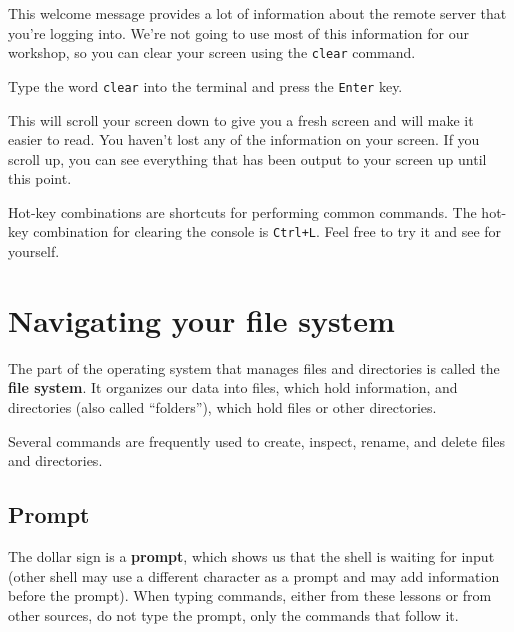 \documentclass[
  letterpaper,
  DIV=11,
  numbers=noendperiod]{scrreprt}
\begin{document}
This welcome message provides a lot of information about the remote
server that you're logging into. We're not going to use most of this
information for our workshop, so you can clear your screen using the
\texttt{clear} command.

Type the word \texttt{clear} into the terminal and press the
\texttt{Enter} key.

This will scroll your screen down to give you a fresh screen and will
make it easier to read. You haven't lost any of the information on your
screen. If you scroll up, you can see everything that has been output to
your screen up until this point.

\begin{tcolorbox}[enhanced jigsaw, opacitybacktitle=0.6, colback=white, coltitle=black, opacityback=0, rightrule=.15mm, toptitle=1mm, toprule=.15mm, bottomtitle=1mm, colframe=quarto-callout-tip-color-frame, arc=.35mm, titlerule=0mm, colbacktitle=quarto-callout-tip-color!10!white, leftrule=.75mm, title=\textcolor{quarto-callout-tip-color}{\faLightbulb}\hspace{0.5em}{Tip}, breakable, bottomrule=.15mm, left=2mm]

Hot-key combinations are shortcuts for performing common commands. The
hot-key combination for clearing the console is \texttt{Ctrl+L}. Feel
free to try it and see for yourself.

\end{tcolorbox}

\section{Navigating your file system}\label{navigating-your-file-system}

The part of the operating system that manages files and directories is
called the \textbf{file system}. It organizes our data into files, which
hold information, and directories (also called ``folders''), which hold
files or other directories.

Several commands are frequently used to create, inspect, rename, and
delete files and directories.

\subsection{Prompt}\label{prompt}

The dollar sign is a \textbf{prompt}, which shows us that the shell is
waiting for input (other shell may use a different character as a prompt
and may add information before the prompt). When typing commands, either
from these lessons or from other sources, do not type the prompt, only
the commands that follow it.
\end{document}
